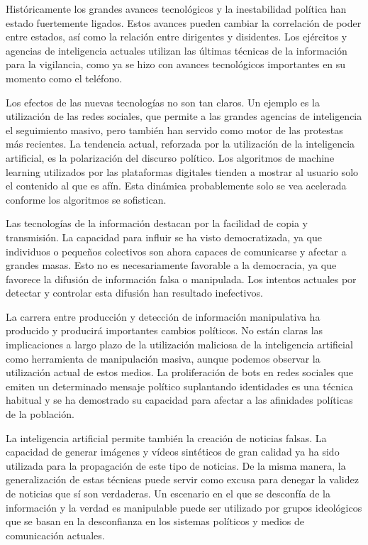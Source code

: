 \documentclass[12pt,a4paper]{article}
\begin{document}
Históricamente los grandes avances tecnológicos y la inestabilidad política han estado fuertemente ligados. Estos avances pueden cambiar la correlación de poder entre estados, así como la relación entre dirigentes y disidentes. Los ejércitos y agencias de inteligencia actuales utilizan las últimas técnicas de la información para la vigilancia, como ya se hizo con avances tecnológicos importantes en su momento como el teléfono.

Los efectos de las nuevas tecnologías no son tan claros. Un ejemplo es la utilización de las redes sociales, que permite a las grandes agencias de inteligencia el seguimiento masivo, pero también han servido como motor de las protestas más recientes. La tendencia actual, reforzada por la utilización de la inteligencia artificial, es la polarización del discurso político. Los algoritmos de machine learning utilizados por las plataformas digitales tienden a mostrar al usuario solo el contenido al que es afín. Esta dinámica probablemente solo se vea acelerada conforme los algoritmos se sofistican.

Las tecnologías de la información destacan por la facilidad de copia y transmisión. La capacidad para influir se ha visto democratizada, ya que individuos o pequeños colectivos son ahora capaces de comunicarse y afectar a grandes masas. Esto no es necesariamente favorable a la democracia, ya que favorece la difusión de información falsa o manipulada. Los intentos actuales por detectar y controlar esta difusión han resultado inefectivos.

La carrera entre producción y detección de información manipulativa ha producido y producirá importantes cambios políticos. No están claras las implicaciones a largo plazo de la utilización maliciosa de la inteligencia artificial como herramienta de manipulación masiva, aunque podemos observar la utilización actual de estos medios. La proliferación de bots en redes sociales que emiten un determinado mensaje político suplantando identidades es una técnica habitual y se ha demostrado su capacidad para afectar a las afinidades políticas de la población.

La inteligencia artificial permite también la creación de noticias falsas. La capacidad de generar imágenes y vídeos sintéticos de gran calidad ya ha sido utilizada para la propagación de este tipo de noticias. De la misma manera, la generalización de estas técnicas puede servir como excusa para denegar la validez de noticias que sí son verdaderas. Un escenario en el que se desconfía de la información y la verdad es manipulable puede ser utilizado por grupos ideológicos que se basan en la desconfianza en los sistemas políticos y medios de comunicación actuales.
\end{document}
